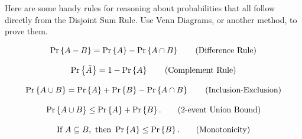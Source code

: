 \documentclass[12pt,twoside]{article}
\newcommand{\union}{\cup}
\newcommand{\intersect}{\cap}
\begin{document}
\begin{problem}{20}
\bparts
{}
Here are some handy rules for reasoning about probabilities that all
follow directly from the Disjoint Sum Rule. Use Venn Diagrams, or another method, to prove them.

\begin{equation}
\pr{A-B}=\pr{A}-\pr{A \intersect B}  \tag{Difference Rule}
\end{equation}

\begin{equation}
\mathop{\textup{Pr}}\nolimits\left\{\bar{A}\right\} = 1 - \mathop{\textup{Pr}}\nolimits\left\{A\right\} \tag{Complement Rule}
\end{equation}

\begin{equation}
\pr{A \union B} = \pr{A}+\pr{B} - \pr{A \intersect B} \tag{Inclusion-Exclusion}
\end{equation}

\begin{equation}
\pr{A \union B} \leq \pr{A}+\pr{B}. \tag{2-event Union Bound}
\end{equation}

\begin{equation}
\text{If } A \subseteq B, \text{ then } \mathop{\textup{Pr}}\nolimits\left\{A\right\} \leq \mathop{\textup{Pr}}\nolimits\left\{B\right\}. \tag{Monotonicity}
\end{equation}


\end{problem}
\end{document}
